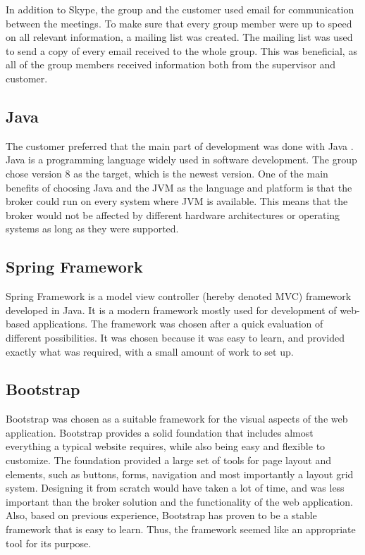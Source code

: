 In addition to Skype, the group and the customer used email for communication between the meetings. To make sure that every group member were up to speed on all relevant information, a mailing list was created. The mailing list was used to send a copy of every email received to the whole group. This was beneficial, as all of the group members received information both from the supervisor and customer.

\subsection{Java}
\label{subsec:prestudies-tools-java}

The customer preferred that the main part of development was done with Java \cite{java}. Java is a programming language widely used in software development. The group chose version 8 as the target, which is the newest version. One of the main benefits of choosing Java and the JVM as the language and platform is that the broker could run on every system where JVM is available. This means that the broker would not be affected by different hardware architectures or operating systems as long as they were supported.

\subsection{Spring Framework}
\label{subsec:prestudies-tools-spring_mvc}

Spring Framework \cite{spring-framework} is a model view controller (hereby denoted MVC) \cite{mvc} framework developed in Java. It is a modern framework mostly used for development of web-based applications. The framework was chosen after a quick evaluation of different possibilities. It was chosen because it was easy to learn, and provided exactly what was required, with a small amount of work to set up.

\subsection{Bootstrap}
\label{subsec:prestudies-tools-bootstrap}

Bootstrap \cite{bootstrap} was chosen as a suitable framework for the visual aspects of the web application. Bootstrap provides a solid foundation that includes almost everything a typical website requires, while also being easy and flexible to customize. The foundation provided a large set of tools for page layout and elements, such as buttons, forms, navigation and most importantly a layout grid system. Designing it from scratch would have taken a lot of time, and was less important than the broker solution and the functionality of the web application. Also, based on previous experience, Bootstrap has proven to be a stable framework that is easy to learn. Thus, the framework seemed like an appropriate tool for its purpose.

